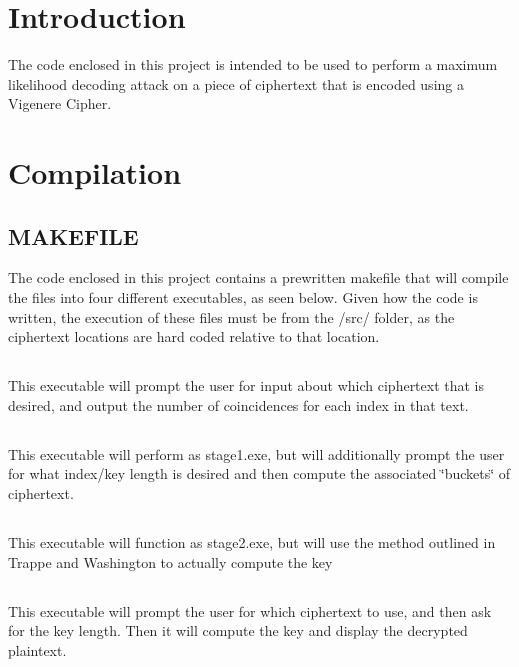 \hypertarget{index_Introduction}{}\section{Introduction}\label{index_Introduction}
The code enclosed in this project is intended to be used to perform a maximum likelihood decoding attack on a piece of ciphertext that is encoded using a Vigenere Cipher. \hypertarget{index_Compilation}{}\section{Compilation}\label{index_Compilation}
\hypertarget{index_MAKEFILE}{}\subsection{M\+A\+K\+E\+F\+I\+LE}\label{index_MAKEFILE}
The code enclosed in this project contains a prewritten makefile that will compile the files into four different executables, as seen below. Given how the code is written, the execution of these files must be from the /src/ folder, as the ciphertext locations are hard coded relative to that location. \hypertarget{_}{}\subsection{}\label{_}
This executable will prompt the user for input about which ciphertext that is desired, and output the number of coincidences for each index in that text. \hypertarget{_}{}\subsection{}\label{_}
This executable will perform as stage1.\+exe, but will additionally prompt the user for what index/key length is desired and then compute the associated \char`\"{}buckets\char`\"{} of ciphertext. \hypertarget{_}{}\subsection{}\label{_}
This executable will function as stage2.\+exe, but will use the method outlined in Trappe and Washington to actually compute the key \hypertarget{_}{}\subsection{}\label{_}
This executable will prompt the user for which ciphertext to use, and then ask for the key length. Then it will compute the key and display the decrypted plaintext. 